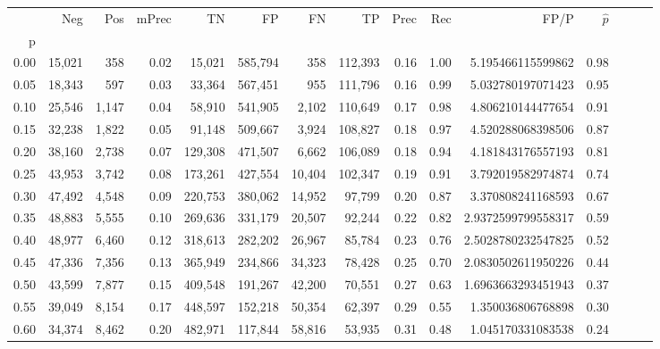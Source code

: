 \begin{tabular}{rrrrrrrrrrrrrrr}
\toprule
{} &     Neg &    Pos & mPrec &       TN &       FP &       FN &       TP &  Prec &   Rec &                  FP/P & $\hat{p}$ \\
p    &         &        &       &          &          &          &          &       &       &                       &           \\
\midrule
0.00 &  15,021 &    358 &  0.02 &   15,021 &  585,794 &      358 &  112,393 &  0.16 &  1.00 &     5.195466115599862 &      0.98 \\
0.05 &  18,343 &    597 &  0.03 &   33,364 &  567,451 &      955 &  111,796 &  0.16 &  0.99 &     5.032780197071423 &      0.95 \\
0.10 &  25,546 &  1,147 &  0.04 &   58,910 &  541,905 &    2,102 &  110,649 &  0.17 &  0.98 &     4.806210144477654 &      0.91 \\
0.15 &  32,238 &  1,822 &  0.05 &   91,148 &  509,667 &    3,924 &  108,827 &  0.18 &  0.97 &     4.520288068398506 &      0.87 \\
0.20 &  38,160 &  2,738 &  0.07 &  129,308 &  471,507 &    6,662 &  106,089 &  0.18 &  0.94 &     4.181843176557193 &      0.81 \\
0.25 &  43,953 &  3,742 &  0.08 &  173,261 &  427,554 &   10,404 &  102,347 &  0.19 &  0.91 &     3.792019582974874 &      0.74 \\
0.30 &  47,492 &  4,548 &  0.09 &  220,753 &  380,062 &   14,952 &   97,799 &  0.20 &  0.87 &     3.370808241168593 &      0.67 \\
0.35 &  48,883 &  5,555 &  0.10 &  269,636 &  331,179 &   20,507 &   92,244 &  0.22 &  0.82 &    2.9372599799558317 &      0.59 \\
0.40 &  48,977 &  6,460 &  0.12 &  318,613 &  282,202 &   26,967 &   85,784 &  0.23 &  0.76 &    2.5028780232547825 &      0.52 \\
0.45 &  47,336 &  7,356 &  0.13 &  365,949 &  234,866 &   34,323 &   78,428 &  0.25 &  0.70 &    2.0830502611950226 &      0.44 \\
0.50 &  43,599 &  7,877 &  0.15 &  409,548 &  191,267 &   42,200 &   70,551 &  0.27 &  0.63 &    1.6963663293451943 &      0.37 \\
0.55 &  39,049 &  8,154 &  0.17 &  448,597 &  152,218 &   50,354 &   62,397 &  0.29 &  0.55 &     1.350036806768898 &      0.30 \\
0.60 &  34,374 &  8,462 &  0.20 &  482,971 &  117,844 &   58,816 &   53,935 &  0.31 &  0.48 &     1.045170331083538 &      0.24 \\

\end{tabular}
